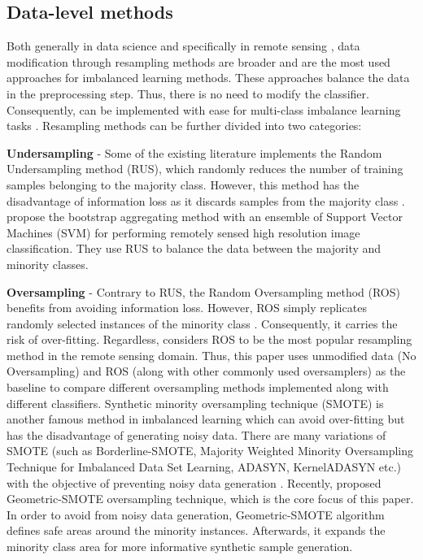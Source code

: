 \documentclass[parskip=full]{scrartcl}
\begin{document}
\subsection{Data-level methods}
Both generally in data science \cite{Douzas2019} and specifically in
remote sensing \cite{Feng2019}, data modification through resampling methods
are broader and are the most used approaches for imbalanced learning methods.
These approaches balance the data in the preprocessing step. Thus, there is
no need to modify the classifier. Consequently, can be implemented with ease
for multi-class imbalance learning tasks \cite{Feng2019}. Resampling methods
can be further divided into two categories:

\textbf{Undersampling} - Some of the existing literature implements the Random
Undersampling method (RUS), which randomly reduces the number of training
samples belonging to the majority class. However, this method has the
disadvantage of information loss as it discards samples from the majority class
\cite{Feng2019}. \cite{Waske2009} propose the bootstrap aggregating method with
an ensemble of Support Vector Machines (SVM) for performing remotely sensed
high resolution image classification. They use RUS to balance the data between
the majority and minority classes.

\textbf{Oversampling} - Contrary to RUS, the Random Oversampling method (ROS)
benefits from avoiding information loss. However, ROS simply replicates
randomly selected instances of the minority class \cite{Douzas2019}.
Consequently, it carries the risk of over-fitting. Regardless, \cite{Feng2019}
considers ROS to be the most popular resampling method in the remote sensing
domain. Thus, this paper uses unmodified data (No Oversampling) and ROS (along
with other commonly used oversamplers) as the baseline to compare different
oversampling methods implemented along with different classifiers. Synthetic
minority oversampling technique (SMOTE) is another famous method in imbalanced
learning which can avoid over-fitting but has the disadvantage of generating
noisy data. There are many variations of SMOTE (such as Borderline-SMOTE,
Majority Weighted Minority Oversampling Technique for Imbalanced Data Set
Learning, ADASYN, KernelADASYN etc.) with the objective of preventing noisy
data generation \cite{Douzas2019, Feng2019}. Recently, \cite{Douzas2019}
proposed Geometric-SMOTE oversampling technique, which is the core focus of
this paper. In order to avoid from noisy data generation, Geometric-SMOTE
algorithm defines safe areas around the minority instances. Afterwards, it
expands the minority class area for more informative synthetic sample
generation.
\end{document}
